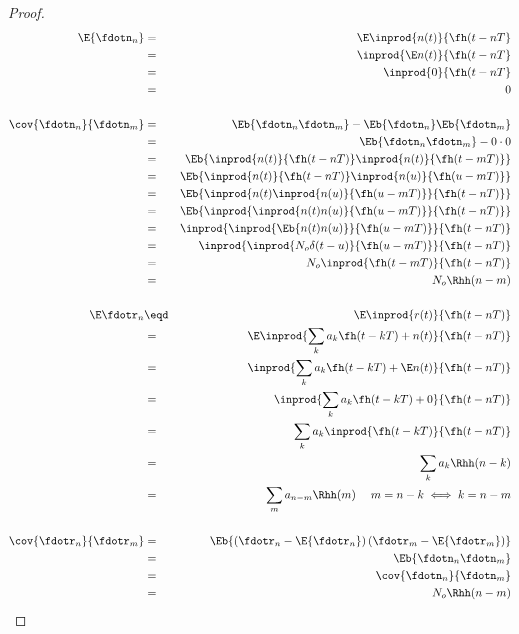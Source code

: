 \begin{proof}
\begin{eqnarray*}
   \E{\fdotn_n}
     &=&    \E \inprod{n(t)}{\fh(t-nT}  
   \\&=&    \inprod{\E n(t)}{\fh(t-nT}  
   \\&=&    \inprod{0}{\fh(t-nT}  
   \\&=&    0
   \\
   \\
   \cov{\fdotn_n}{\fdotn_m}
     &=& \Eb{\fdotn_n \fdotn_m} - \Eb{\fdotn_n}\Eb{\fdotn_m}
   \\&=& \Eb{\fdotn_n \fdotn_m} - 0\cdot0
   \\&=& \Eb{\inprod{n(t)}{\fh(t-nT)} \inprod{n(t)}{\fh(t-mT)}}
   \\&=& \Eb{\inprod{n(t)}{\fh(t-nT)} \inprod{n(u)}{\fh(u-mT)}}
   \\&=& \Eb{\inprod{n(t)\inprod{n(u)}{\fh(u-mT)}}{\fh(t-nT)} }
   \\&=& \Eb{\inprod{\inprod{n(t)n(u)}{\fh(u-mT)}}{\fh(t-nT)} }
   \\&=& \inprod{\inprod{\Eb{n(t)n(u)}}{\fh(u-mT)}}{\fh(t-nT)}
   \\&=& \inprod{\inprod{N_o\delta(t-u)}{\fh(u-mT)}}{\fh(t-nT)}
   \\&=& N_o \inprod{\fh(t-mT)}{\fh(t-nT)}
   \\&=& N_o \Rhh(n-m)
   \\
   \\
   \E\fdotr_n 
     &\eqd& \E\inprod{r(t)}{\fh(t-nT)}  
   \\&=&    \E\inprod{\sum_k a_k \fh(t-kT) + n(t)}{\fh(t-nT)}  
   \\&=&    \inprod{\sum_k a_k \fh(t-kT) + \E n(t)}{\fh(t-nT)}  
   \\&=&    \inprod{\sum_k a_k \fh(t-kT) + 0}{\fh(t-nT)}  
   \\&=&    \sum_k a_k \inprod{\fh(t-kT)}{\fh(t-nT)}  
   \\&=&    \sum_k a_k \Rhh(n-k)
   \\&=&    \sum_m a_{n-m} \Rhh(m)  \hspace{3ex}m=n-k \iff k=n-m
   \\
   \\
   \cov{\fdotr_n}{\fdotr_m}
     &=& \Eb{\left(\fdotr_n-\E{\fdotr_n}\right)\left(\fdotr_m-\E{\fdotr_m}\right)}
   \\&=& \Eb{\fdotn_n \fdotn_m }
   \\&=& \cov{\fdotn_n}{\fdotn_m}
   \\&=& N_o \Rhh(n-m)
\end{eqnarray*}
\end{proof}


